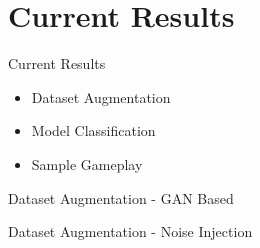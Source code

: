 \section{Current Results}
\begin{frame}{Current Results}
    \begin{itemize}
        \item Dataset Augmentation
        \item Model Classification
        \item Sample Gameplay
    \end{itemize}
\end{frame}

\begin{frame}{Dataset Augmentation - GAN Based}
    \begin{figure}[htpb!]
        \centering
    \end{figure}
\end{frame}

\begin{frame}{Dataset Augmentation - Noise Injection}
    \begin{figure}[htpb!]
        \centering
    \end{figure}
\end{frame}

